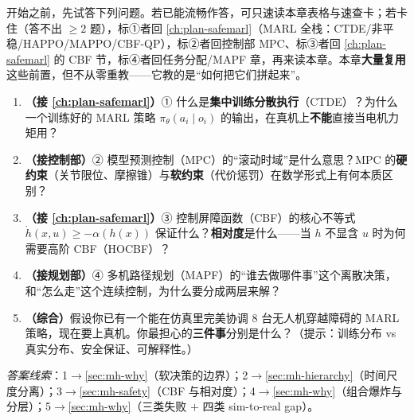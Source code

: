 \begin{practice}[前置自测]
开始之前，先试答下列问题。若已能流畅作答，可只速读本章表格与速查卡；若卡住（答不出 $\ge 2$ 题），标①者回 \cref{ch:plan-safemarl}（MARL 全栈：CTDE/非平稳/HAPPO/MAPPO/CBF-QP），标②者回控制部 MPC、标③者回 \cref{ch:plan-safemarl} 的 CBF 节，标④者回任务分配/MAPF 章，再来读本章。本章\textbf{大量复用}这些前置，但不从零重教——它教的是“如何把它们拼起来”。
\begin{enumerate}
  \item \textbf{（接 \cref{ch:plan-safemarl}）}① 什么是\textbf{集中训练分散执行}（CTDE）？为什么一个训练好的 MARL 策略 $\pi_\theta(a_i\mid o_i)$ 的输出，在真机上\textbf{不能}直接当电机力矩用？
  \item \textbf{（接控制部）}② 模型预测控制（MPC）的“滚动时域”是什么意思？MPC 的\textbf{硬约束}（关节限位、摩擦锥）与\textbf{软约束}（代价惩罚）在数学形式上有何本质区别？
  \item \textbf{（接 \cref{ch:plan-safemarl}）}③ 控制屏障函数（CBF）的核心不等式 $\dot h(x,u)\ge-\alpha(h(x))$ 保证什么？\textbf{相对度}是什么——当 $h$ 不显含 $u$ 时为何需要高阶 CBF（HOCBF）？
  \item \textbf{（接规划部）}④ 多机路径规划（MAPF）的“谁去做哪件事”这个离散决策，和“怎么走”这个连续控制，为什么要分成两层来解？
  \item \textbf{（综合）}假设你已有一个能在仿真里完美协调 $8$ 台无人机穿越障碍的 MARL 策略，现在要上真机。你最担心的\textbf{三件事}分别是什么？（提示：训练分布 vs 真实分布、安全保证、可解释性。）
\end{enumerate}
\noindent\emph{答案线索}：1$\to$\cref{sec:mh-why}（软决策的边界）；2$\to$\cref{sec:mh-hierarchy}（时间尺度分离）；3$\to$\cref{sec:mh-safety}（CBF 与相对度）；4$\to$\cref{sec:mh-why}（组合爆炸与分层）；5$\to$\cref{sec:mh-why}（三类失败 $+$ 四类 sim-to-real gap）。
\end{practice}

